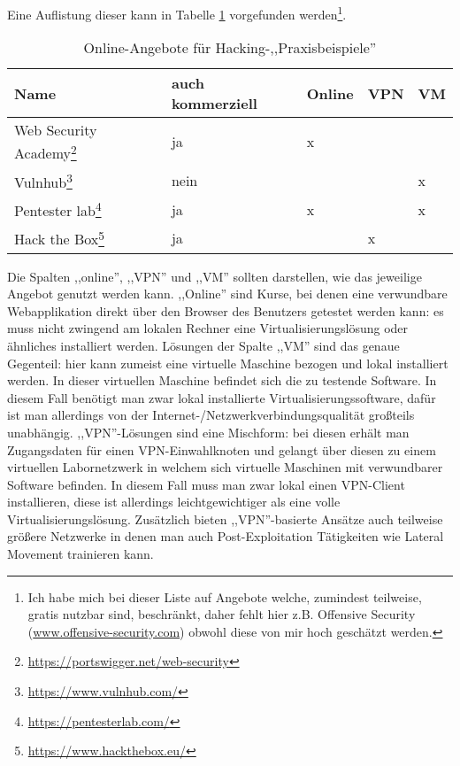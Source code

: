 Eine Auflistung dieser kann in Tabelle \ref{tbl:online_hacking} vorgefunden werden\footnote{Ich habe mich bei dieser Liste auf Angebote welche, zumindest teilweise, gratis nutzbar sind, beschränkt, daher fehlt hier z.B. Offensive Security (\url{www.offensive-security.com}) obwohl diese von mir hoch geschätzt werden.}.

\begin{table}
	\begin{center}
\begin{tabular}{lllll}
	\toprule
	Name & auch kommerziell & Online & VPN & VM \\
	\midrule
	Web Security Academy\footnote{\url{https://portswigger.net/web-security}}  & ja   & x &   &   \\
	Vulnhub\footnote{\url{https://www.vulnhub.com/}}              & nein &   &   & x \\
	Pentester lab\footnote{\url{https://pentesterlab.com/}}        & ja   & x &   & x \\
	Hack the Box\footnote{\url{https://www.hackthebox.eu/}}         & ja   & ~ & x &   \\
	\bottomrule
\end{tabular}
\end{center}
	\caption{Online-Angebote für Hacking-,,Praxisbeispiele''}
	\label{tbl:online_hacking}
\end{table}

Die Spalten ,,online'', ,,VPN'' und ,,VM'' sollten darstellen, wie das jeweilige Angebot genutzt werden kann. ,,Online'' sind Kurse, bei denen eine verwundbare Webapplikation direkt über den Browser des Benutzers getestet werden kann: es muss nicht zwingend am lokalen Rechner eine Virtualisierungslösung oder ähnliches installiert werden. Lösungen der Spalte ,,VM'' sind das genaue Gegenteil: hier kann zumeist eine virtuelle Maschine bezogen und lokal installiert werden. In dieser virtuellen Maschine befindet sich die zu testende Software. In diesem Fall benötigt man zwar lokal installierte Virtualisierungssoftware, dafür ist man allerdings von der Internet-/Netzwerkverbindungsqualität großteils unabhängig. ,,VPN''-Lösungen sind eine Mischform: bei diesen erhält man Zugangsdaten für einen VPN-Einwahlknoten und gelangt über diesen zu einem virtuellen Labornetzwerk in welchem sich virtuelle Maschinen mit verwundbarer Software befinden. In diesem Fall muss man zwar lokal einen VPN-Client installieren, diese ist allerdings leichtgewichtiger als eine volle Virtualisierungslösung. Zusätzlich bieten ,,VPN''-basierte Ansätze auch teilweise größere Netzwerke in denen man auch Post-Exploitation Tätigkeiten wie Lateral Movement trainieren kann.


